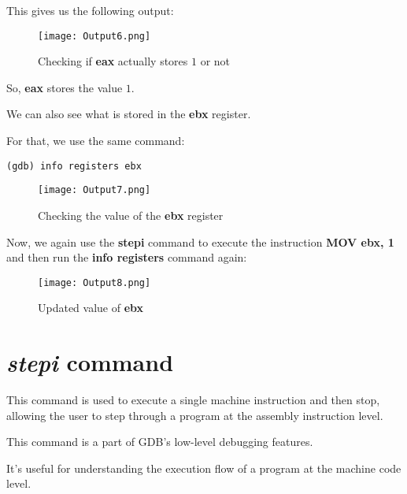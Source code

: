 \documentclass{article}
\makeatletter
\renewcommand\paragraph{\@startsection{paragraph}{4}{\z@}{-3.25ex \@plus -1ex \@minus -.2ex}{1.5ex \@plus .2ex}{\normalfont\normalsize\bfseries}}
\makeatother
\begin{document}
\newpage
This gives us the following output:
\begin{figure}[h]
\centering
\texttt{[image: Output6.png]}
\caption{Checking if \textbf{eax} actually stores $1$ or not}
\end{figure}

So, \textbf{eax} stores the value $1$.

We can also see what is stored in the \textbf{ebx} register.

For that, we use the same command:
\begin{Verbatim}[frame=single]
(gdb) info registers ebx
\end{Verbatim}
\begin{figure}[h]
\centering
\texttt{[image: Output7.png]}
\caption{Checking the value of the \textbf{ebx} register}
\end{figure}

Now, we again use the \textbf{stepi} command to execute the instruction \textbf{MOV ebx, 1} and then run the \textbf{info registers} command again:
\begin{figure}[h]
\centering
\texttt{[image: Output8.png]}
\caption{Updated value of \textbf{ebx}}
\end{figure}

\newpage
\section{\textit{stepi} command}\label{sec:stepi}
\paragraph{}
This command is used to execute a single machine instruction and then stop, allowing the user to step through a program at the assembly instruction level.

This command is a part of GDB's low-level debugging features.

It's useful for understanding the execution flow of a program at the machine code level.
\end{document}
